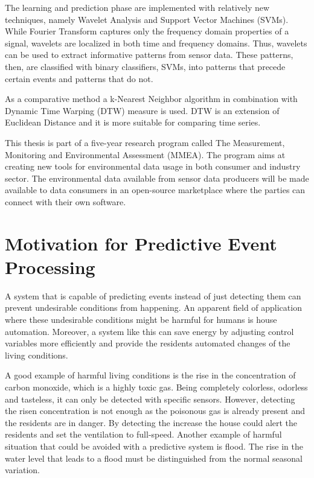 The learning and prediction phase are implemented with relatively new techniques, namely Wavelet Analysis and Support Vector Machines (SVMs). While Fourier Transform captures only the frequency domain properties of a signal, wavelets are localized in both time and frequency domains. \cite{Fong04} Thus, wavelets can be used to extract informative patterns from sensor data. These patterns, then, are classified with  binary classifiers, SVMs, into patterns that precede certain events and patterns that do not.

As a comparative method a k-Nearest Neighbor algorithm in combination with Dynamic Time Warping (DTW) measure is used. DTW is an extension of Euclidean Distance and it is more suitable for comparing time series.

This thesis is part of a five-year research program called The Measurement, Monitoring and Environmental Assessment (MMEA). The program aims at creating new tools for environmental data usage in both consumer and industry sector. The environmental data available from sensor data producers will be made available to data consumers in an open-source marketplace where the parties can connect with their own software. \cite{MMEA}


\section{Motivation for Predictive Event Processing}
A system that is capable of predicting events instead of just detecting them can prevent undesirable conditions from happening. An apparent field of application where these undesirable conditions might be harmful for humans is house automation. Moreover, a system like this can save energy by adjusting control variables more efficiently and provide the residents automated changes of the living conditions. \cite{Skon}

A good example of harmful living conditions is the rise in the concentration of carbon monoxide, which is a highly toxic gas. Being completely colorless, odorless and tasteless, it can only be detected with specific sensors. However, detecting the risen concentration is not enough as the poisonous gas is already present and the residents are in danger. By detecting the increase the house could alert the residents and set the ventilation to full-speed. \cite{Yeganeh12} Another example of harmful situation that could be avoided with a predictive system is flood. The rise in the water level that leads to a flood must be distinguished from the normal seasonal variation. \cite{Verbunt07} 

